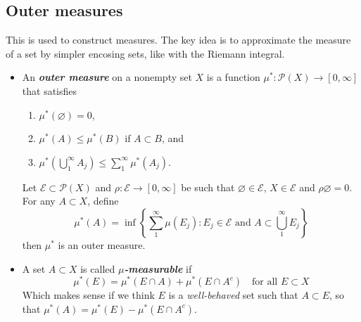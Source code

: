 \documentclass{article}
\theoremstyle{definition}
\numberwithin{equation}{section}
\begin{document}
	\subsection{Outer measures}
	This is used to construct measures. The key idea is to approximate the measure of a set by simpler encosing sets, like with the Riemann integral.
	\begin{itemize}
		\item An \textbf{\textit{outer measure}} on a nonempty set $X$ is a function $\mu^*:\mathcal{P}(X)\to[0,\infty]$ that satisfies
		\begin{enumerate}
			\item $\mu^*(\varnothing)=0$,
			\item $\mu^*(A)\leq\mu^*(B)$ if $A\subset B$, and
			\item $\mu^*\left(\bigcup_{1}^\infty A_j\right)\leq\sum_1^\infty\mu^*(A_j)$.
		\end{enumerate}

	\begin{prop}
		Let $\mathcal{E}\subset\mathcal{P}(X)$ and $\rho:\mathcal{E}\to[0,\infty]$ be such that $\varnothing\in\mathcal{E}$, $X\in\mathcal{E}$ and $\rho{\varnothing}=0$. For any $A\subset X$, define
		\begin{equation}\label{eq:outer-measure}
			\mu^*(A)=\inf\left\{\sum_1^\infty\mu(E_j):E_j\in\mathcal{E}\text{ and }A\subset\bigcup_1^\infty E_j\right\}
		\end{equation}
		then $\mu^*$ is an outer measure.
	\end{prop}
		\item A set $A\subset X$ is called \textbf{\textit{$\mu$-measurable}} if
		\[\mu^*(E)=\mu^*(E\cap A)+\mu^*(E\cap A^c)\quad\text{for all } E\subset X\]
		Which makes sense if we think $E$ is a \textit{well-behaved} set such that $A\subset E$, so that $\mu^*(A)=\mu^*(E)-\mu^*(E\cap A^c)$.
		

\end{itemize}
\end{document}
